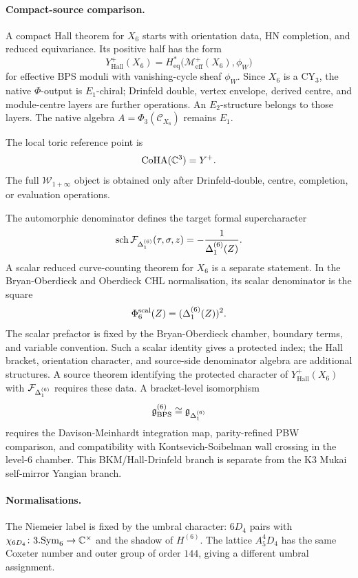 \paragraph{Compact-source comparison.}
A compact Hall theorem for $X_6$ starts with orientation data, HN
completion, and reduced equivariance. Its positive half has the form
\[
  Y^+_{\mathrm{Hall}}(X_6)=H^*_{\mathrm{eq}}
  \bigl(\mathcal{M}^+_{\mathrm{eff}}(X_6),\phi_W\bigr)
\]
for effective BPS moduli with vanishing-cycle sheaf $\phi_W$. Since
$X_6$ is a CY$_3$, the native $\Phi$-output is $E_1$-chiral; Drinfeld
double, vertex envelope, derived centre, and module-centre layers are
further operations. An $E_2$-structure belongs to those layers. The
native algebra $A=\Phi_3(\mathcal C_{X_6})$ remains $E_1$.

The local toric reference point is
\[
  \mathrm{CoHA}(\mathbb{C}^3)=Y^+ .
\]
The full $\mathcal W_{1+\infty}$ object is obtained only after
Drinfeld-double, centre, completion, or evaluation operations.

The automorphic denominator defines the target formal supercharacter
\[
  \operatorname{sch}\mathcal{F}_{\Delta_{1}^{(6)}}(\tau,\sigma,z)
  =-\frac{1}{\Delta_{1}^{(6)}(Z)}.
\]
A scalar reduced curve-counting theorem for $X_6$ is a separate
statement. In the Bryan-Oberdieck and Oberdieck CHL normalisation, its
scalar denominator is the square
\[
  \Phi^{\mathrm{scal}}_6(Z)=(\Delta_{1}^{(6)}(Z))^2 .
\]
The scalar prefactor is fixed by the Bryan-Oberdieck chamber, boundary
terms, and variable convention. Such a scalar identity gives a protected
index; the Hall bracket, orientation character, and source-side
denominator algebra are additional structures. A source theorem
identifying the protected character of $Y^+_{\mathrm{Hall}}(X_6)$ with
$\mathcal{F}_{\Delta_{1}^{(6)}}$ requires these data. A bracket-level
isomorphism
\[
  \mathfrak{g}_{\mathrm{BPS}}^{(6)}\cong\mathfrak{g}_{\Delta_{1}^{(6)}}
\]
requires the Davison-Meinhardt integration map, parity-refined PBW
comparison, and compatibility with Kontsevich-Soibelman wall crossing
in the level-$6$ chamber. This BKM/Hall-Drinfeld branch is separate from
the K3 Mukai self-mirror Yangian branch.

\paragraph{Normalisations.}
The Niemeier label is fixed by the umbral character:
$6D_4$ pairs with $\chi_{6D_4}\colon3.\mathrm{Sym}_6\to\mathbb{C}^\times$ and
the shadow of $H^{(6)}$. The lattice $A_5^4D_4$ has the same Coxeter
number and outer group of order $144$, giving a different umbral
assignment.

